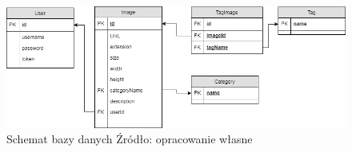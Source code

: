\begin{figure}[ht]
	\centering
	\includegraphics[width=12cm]{images/bazaDanych}
	\caption{Schemat bazy danych
		\newline Źródło: opracowanie własne}
	\label{fig:database}
\end{figure}
